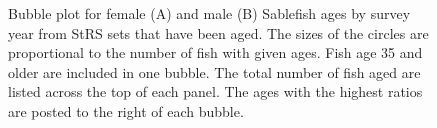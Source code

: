 \documentclass[12pt]{article}\usepackage[]{graphicx}\usepackage[]{color}
\begin{document}
\begin{figure}[htb]

{\centering {} 

}

\caption{Bubble plot for female (A) and male (B) Sablefish ages by survey year from StRS sets that have been aged. The sizes of the circles are proportional to the number of fish with given ages. Fish age 35 and older are included in one bubble. The total number of fish aged are listed across the top of each panel. The ages with the highest ratios are posted to the right of each bubble.}\label{fig:figure16}
\end{figure}
\clearpage
\end{document}
